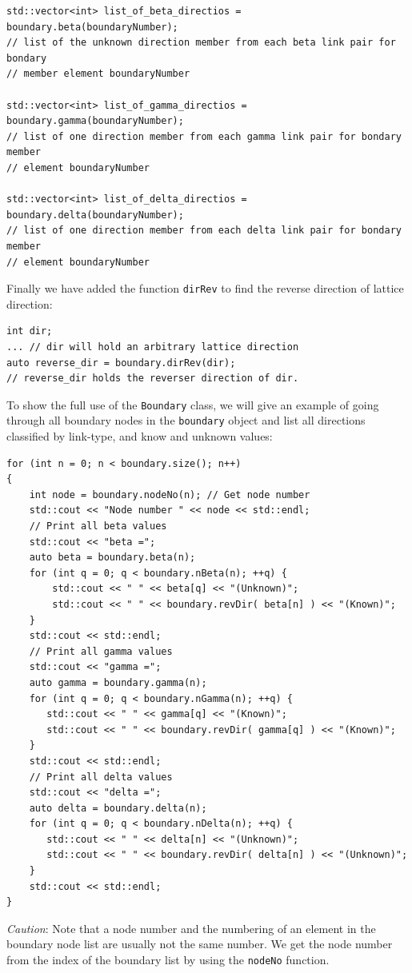 \documentclass[11pt,a4paper]{report}
\begin{document}
\begin{verbatim}
std::vector<int> list_of_beta_directios = boundary.beta(boundaryNumber);
// list of the unknown direction member from each beta link pair for bondary
// member element boundaryNumber

std::vector<int> list_of_gamma_directios = boundary.gamma(boundaryNumber);
// list of one direction member from each gamma link pair for bondary member
// element boundaryNumber

std::vector<int> list_of_delta_directios = boundary.delta(boundaryNumber);
// list of one direction member from each delta link pair for bondary member
// element boundaryNumber
\end{verbatim}
Finally we have added the function \texttt{dirRev} to find the reverse direction of lattice direction:
\begin{verbatim}
int dir;
... // dir will hold an arbitrary lattice direction
auto reverse_dir = boundary.dirRev(dir);
// reverse_dir holds the reverser direction of dir.
\end{verbatim}
To show the full use of the \texttt{Boundary} class, we will give an example of going through all boundary nodes in the \texttt{boundary} object and list all directions classified by link-type, and know and unknown values:
\begin{verbatim}
for (int n = 0; n < boundary.size(); n++) 
{
    int node = boundary.nodeNo(n); // Get node number
    std::cout << "Node number " << node << std::endl;
    // Print all beta values
    std::cout << "beta =";
    auto beta = boundary.beta(n);
    for (int q = 0; q < boundary.nBeta(n); ++q) {
        std::cout << " " << beta[q] << "(Unknown)";
        std::cout << " " << boundary.revDir( beta[n] ) << "(Known)";
    }
    std::cout << std::endl;
    // Print all gamma values
    std::cout << "gamma =";
    auto gamma = boundary.gamma(n); 
    for (int q = 0; q < boundary.nGamma(n); ++q) {
       std::cout << " " << gamma[q] << "(Known)";
       std::cout << " " << boundary.revDir( gamma[q] ) << "(Known)";
    }
    std::cout << std::endl;
    // Print all delta values
    std::cout << "delta =";
    auto delta = boundary.delta(n);
    for (int q = 0; q < boundary.nDelta(n); ++q) {
       std::cout << " " << delta[n] << "(Unknown)";
       std::cout << " " << boundary.revDir( delta[n] ) << "(Unknown)";
    }
    std::cout << std::endl;
}
\end{verbatim} 
\emph{Caution}: Note that a node number and the numbering of an element in the boundary node list are usually not the same number. We get the node number from the index of the boundary list by using the \texttt{nodeNo} function.
\end{document}
